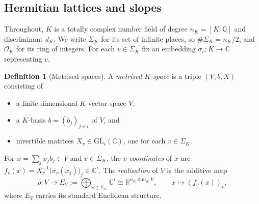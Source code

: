 \documentclass[10pt]{amsart}
\theoremstyle{definition}
\newtheorem{definition}[theorem]{Definition}
\theoremstyle{remark}
\newcommand{\C}{\mathbb C}
\newcommand{\R}{\mathbb R}
\newcommand{\Q}{\mathbb Q}
\begin{document}
\subsection{Hermitian lattices and slopes}\label{subsec:HL}

Throughout, $K$ is a totally complex number field of degree $n_K=[K:\Q]$ and discriminant $d_K$. We write $\Sigma_K$ for its set of infinite places, so $\#\Sigma_K=n_K/2$, and $\mathcal O_K$ for its ring of integers. For each $v\in\Sigma_K$ fix an embedding $\sigma_v\colon K\to\C$ representing $v$.

\begin{definition}[Metrised spaces]\label{def:metrised}
A \emph{metrised $K$-space} is a triple $(V,b,X)$ consisting of
\begin{itemize}
\item a finite-dimensional $K$-vector space $V$,
\item a $K$-basis $b=(b_j)_{j\in\iota}$ of $V$, and
\item invertible matrices $X_v\in\mathrm{GL}_\iota(\C)$, one for each $v\in\Sigma_K$.
\end{itemize}
For $x=\sum_jx_jb_j\in V$ and $v\in\Sigma_K$, the \emph{$v$-coordinates} of $x$ are $f_v(x)=X_v^{-1}\bigl(\sigma_v(x_j)\bigr)_j\in\C^\iota$. The \emph{realisation} of $V$ is the additive map
\[
\rho\colon V\longrightarrow E_V:=\bigoplus_{v\in\Sigma_K}\C^\iota\cong\R^{n_K\dim_KV},\qquad x\longmapsto(f_v(x))_v,
\]
where $E_V$ carries its standard Euclidean structure.
\end{definition}
\end{document}
